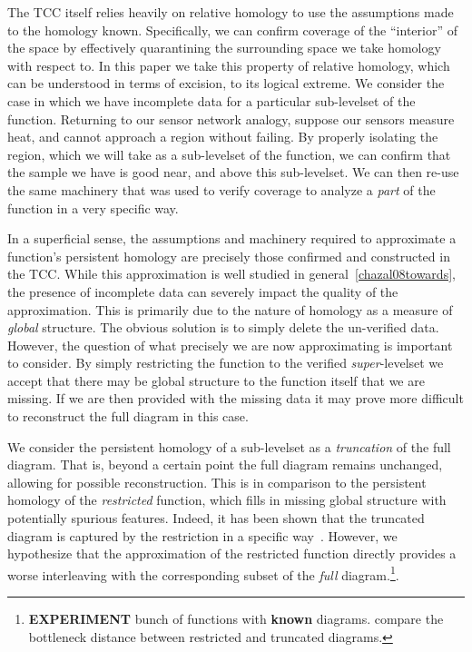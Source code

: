 The TCC itself relies heavily on relative homology to use the assumptions made to the homology known.
Specifically, we can confirm coverage of the ``interior'' of the space by effectively quarantining the surrounding space we take homology with respect to.
In this paper we take this property of relative homology, which can be understood in terms of excision, to its logical extreme.
We consider the case in which we have incomplete data for a particular sub-levelset of the function.
Returning to our sensor network analogy, suppose our sensors measure heat, and cannot approach a region without failing.
By properly isolating the region, which we will take as a sub-levelset of the function, we can confirm that the sample we have is good near, and above this sub-levelset.
We can then re-use the same machinery that was used to verify coverage to analyze a \emph{part} of the function in a very specific way.

In a superficial sense, the assumptions and machinery required to approximate a function's persistent homology are precisely those confirmed and constructed in the TCC. %
While this approximation is well studied in general~\ref{chazal08towards}, the presence of incomplete data can severely impact the quality of the approximation.
This is primarily due to the nature of homology as a measure of \emph{global} structure.
The obvious solution is to simply delete the un-verified data.
However, the question of what precisely we are now approximating is important to consider.
By simply restricting the function to the verified \emph{super}-levelset we accept that there may be global structure to the function itself that we are missing.
If we are then provided with the missing data it may prove more difficult to reconstruct the full diagram in this case.

We consider the persistent homology of a sub-levelset as a \emph{truncation} of the full diagram.
That is, beyond a certain point the full diagram remains unchanged, allowing for possible reconstruction.
This is in comparison to the persistent homology of the \emph{restricted} function, which fills in missing global structure with potentially spurious features.
Indeed, it has been shown that the truncated diagram is captured by the restriction in a specific way~\cite{extendedpersistence}.
However, we hypothesize that the approximation of the restricted function directly provides a worse interleaving with the corresponding subset of the \emph{full} diagram.\footnote{\textbf{EXPERIMENT} bunch of functions with \textbf{known} diagrams. compare the bottleneck distance between restricted and truncated diagrams.}.

